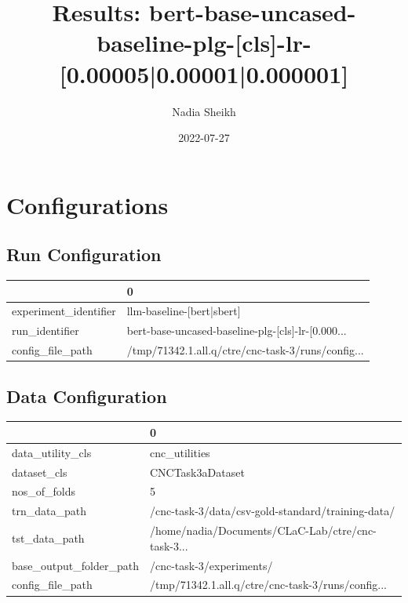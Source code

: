 \documentclass{article}
\title{Results: bert-base-uncased-baseline-plg-[cls]-lr-[0.00005|0.00001|0.000001]}
\author{Nadia Sheikh}
\date{2022-07-27}
\begin{document}
\maketitle
\section{Configurations}
\subsection{Run Configuration}
\begin{tabular}{ll}
\toprule
{} &                                                  0 \\
\midrule
experiment\_identifier &                          llm-baseline-[bert|sbert] \\
run\_identifier        &  bert-base-uncased-baseline-plg-[cls]-lr-[0.000... \\
config\_file\_path      &  /tmp/71342.1.all.q/ctre/cnc-task-3/runs/config... \\
\bottomrule
\end{tabular}

\subsection{Data Configuration}
\begin{tabular}{ll}
\toprule
{} &                                                  0 \\
\midrule
data\_utility\_cls        &                                      cnc\_utilities \\
dataset\_cls             &                                   CNCTask3aDataset \\
nos\_of\_folds            &                                                  5 \\
trn\_data\_path           &  /cnc-task-3/data/csv-gold-standard/training-data/ \\
tst\_data\_path           &  /home/nadia/Documents/CLaC-Lab/ctre/cnc-task-3... \\
base\_output\_folder\_path &                           /cnc-task-3/experiments/ \\
config\_file\_path        &  /tmp/71342.1.all.q/ctre/cnc-task-3/runs/config... \\
\bottomrule
\end{tabular}
\end{document}
